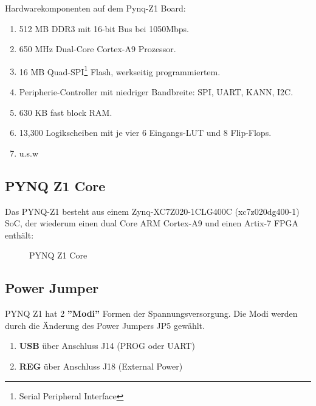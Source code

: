 \documentclass[a4paper]{report}
\begin{document}
Hardwarekomponenten auf dem Pynq-Z1 Board:

	\begin{enumerate} 
	\item 512 MB DDR3 mit 16-bit Bus bei 1050Mbps.
	\item 650 MHz Dual-Core Cortex-A9 Prozessor.
	\item 16 MB Quad-SPI\footnote{Serial Peripheral Interface} Flash, werkseitig programmiertem.
	\item Peripherie-Controller mit niedriger Bandbreite: SPI, UART, KANN, I2C.
	\item 630 KB fast block RAM.
	\item13,300 Logikscheiben mit je vier 6 Eingangs-LUT und 8 Flip-Flops.
	\item u.s.w\\
	\end{enumerate}

\subsection{PYNQ Z1 Core}
Das PYNQ-Z1 besteht aus einem Zynq-XC7Z020-1CLG400C (xc7z020dg400-1) SoC, der wiederum einen dual Core ARM Cortex-A9 und einen Artix-7 FPGA enthält:

	\begin{figure}[H]
	\centering
	\caption{PYNQ Z1 Core}
	\label{PYNQ Z1 Core}
	\end{figure}


\subsection{Power Jumper}

PYNQ Z1 hat 2 \textbf{''Modi''} Formen der Spannungsversorgung. Die Modi werden durch die Änderung des Power Jumpers JP5 gewählt.

\begin{enumerate} 
\item \textbf{USB} über Anschluss J14 (PROG oder UART)
\item  \textbf{REG} über Anschluss J18 (External Power)\\
\end{enumerate}
\end{document}
